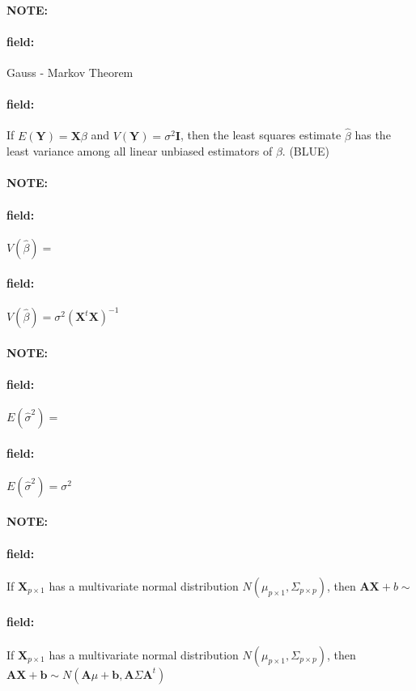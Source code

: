 \documentclass[12pt]{article}
\newenvironment{note}{\paragraph{NOTE:}}{}
\newenvironment{field}{\paragraph{field:}}{}
\begin{document}
\begin{note}
  \begin{field}
    Gauss - Markov Theorem
  \end{field}
  \begin{field}
    If $E(\mathbf{Y}) = \mathbf{X}\beta$ and $V(\mathbf{Y}) = \sigma^2 \mathbf{I}$, then the least squares estimate $\hat{\beta}$ has the least variance among all linear unbiased estimators of $\beta$. (BLUE)
  \end{field}
\end{note}



\begin{note}
  \begin{field}
    $V(\hat{\beta}) = $
  \end{field}
  \begin{field}
    $V(\hat{\beta}) = \sigma^2 (\mathbf{X}^t \mathbf{X})^{-1}$
  \end{field}
\end{note}

\begin{note}
  \begin{field}
    $E(\hat{\sigma}^2) = $
  \end{field}
  \begin{field}
    $E(\hat{\sigma}^2) = \sigma^2$
  \end{field}
\end{note}

\begin{note}
  \begin{field}
    If $\mathbf{X}_{p \times 1}$ has a multivariate normal distribution $N(\mu_{p\times 1}, \Sigma_{p \times p})$, then $\mathbf{AX} + b \sim $
  \end{field}
  \begin{field}
    If $\mathbf{X}_{p \times 1}$ has a multivariate normal distribution $N(\mu_{p\times 1}, \Sigma_{p \times p})$, then $\mathbf{AX} + \mathbf{b} \sim N(\mathbf{A}\mu + \mathbf{b}, \mathbf{A}\Sigma \mathbf{A}^t)$



  \end{field}
\end{note}
\end{document}
